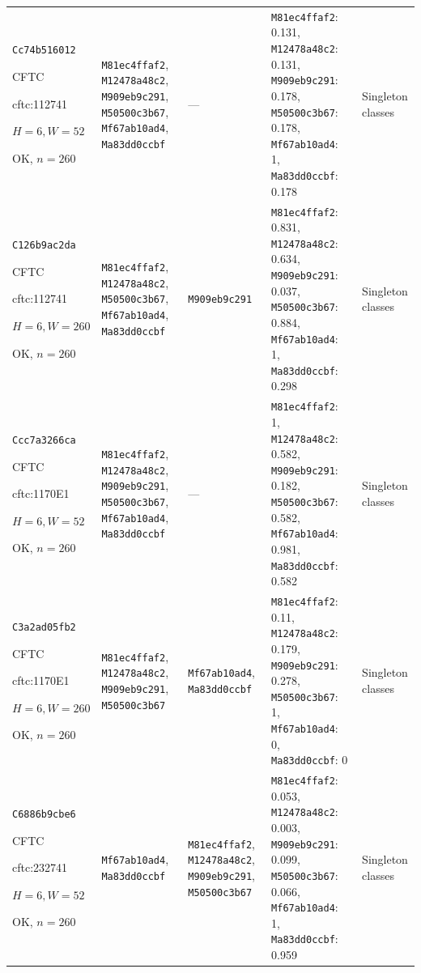 \begin{longtable}{p{.15\linewidth}p{.17\linewidth}p{.17\linewidth}p{.25\linewidth}p{.14\linewidth}}
\texttt{Cc74b516012}\par CFTC\par cftc:112741\par $H=6,W=52$\par OK, $n=260$ & \texttt{M81ec4ffaf2}, \texttt{M12478a48c2}, \texttt{M909eb9c291}, \texttt{M50500c3b67}, \texttt{Mf67ab10ad4}, \texttt{Ma83dd0ccbf} & --- & \texttt{M81ec4ffaf2}: 0.131, \texttt{M12478a48c2}: 0.131, \texttt{M909eb9c291}: 0.178, \texttt{M50500c3b67}: 0.178, \texttt{Mf67ab10ad4}: 1, \texttt{Ma83dd0ccbf}: 0.178 & Singleton classes \\
\texttt{C126b9ac2da}\par CFTC\par cftc:112741\par $H=6,W=260$\par OK, $n=260$ & \texttt{M81ec4ffaf2}, \texttt{M12478a48c2}, \texttt{M50500c3b67}, \texttt{Mf67ab10ad4}, \texttt{Ma83dd0ccbf} & \texttt{M909eb9c291} & \texttt{M81ec4ffaf2}: 0.831, \texttt{M12478a48c2}: 0.634, \texttt{M909eb9c291}: 0.037, \texttt{M50500c3b67}: 0.884, \texttt{Mf67ab10ad4}: 1, \texttt{Ma83dd0ccbf}: 0.298 & Singleton classes \\
\texttt{Ccc7a3266ca}\par CFTC\par cftc:1170E1\par $H=6,W=52$\par OK, $n=260$ & \texttt{M81ec4ffaf2}, \texttt{M12478a48c2}, \texttt{M909eb9c291}, \texttt{M50500c3b67}, \texttt{Mf67ab10ad4}, \texttt{Ma83dd0ccbf} & --- & \texttt{M81ec4ffaf2}: 1, \texttt{M12478a48c2}: 0.582, \texttt{M909eb9c291}: 0.182, \texttt{M50500c3b67}: 0.582, \texttt{Mf67ab10ad4}: 0.981, \texttt{Ma83dd0ccbf}: 0.582 & Singleton classes \\
\texttt{C3a2ad05fb2}\par CFTC\par cftc:1170E1\par $H=6,W=260$\par OK, $n=260$ & \texttt{M81ec4ffaf2}, \texttt{M12478a48c2}, \texttt{M909eb9c291}, \texttt{M50500c3b67} & \texttt{Mf67ab10ad4}, \texttt{Ma83dd0ccbf} & \texttt{M81ec4ffaf2}: 0.11, \texttt{M12478a48c2}: 0.179, \texttt{M909eb9c291}: 0.278, \texttt{M50500c3b67}: 1, \texttt{Mf67ab10ad4}: 0, \texttt{Ma83dd0ccbf}: 0 & Singleton classes \\
\texttt{C6886b9cbe6}\par CFTC\par cftc:232741\par $H=6,W=52$\par OK, $n=260$ & \texttt{Mf67ab10ad4}, \texttt{Ma83dd0ccbf} & \texttt{M81ec4ffaf2}, \texttt{M12478a48c2}, \texttt{M909eb9c291}, \texttt{M50500c3b67} & \texttt{M81ec4ffaf2}: 0.053, \texttt{M12478a48c2}: 0.003, \texttt{M909eb9c291}: 0.099, \texttt{M50500c3b67}: 0.066, \texttt{Mf67ab10ad4}: 1, \texttt{Ma83dd0ccbf}: 0.959 & Singleton classes \\

\end{longtable}
